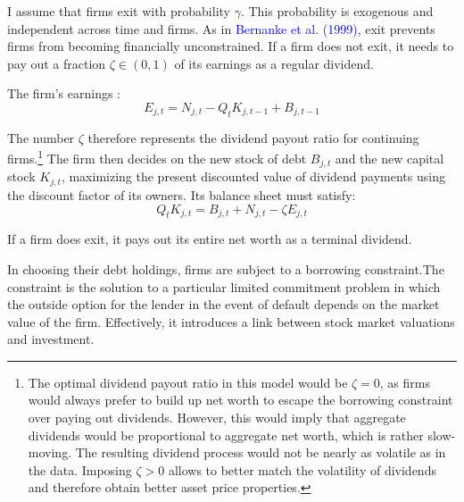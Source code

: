\documentclass[cn,10pt,math=newtx,citestyle=gb7714-2015,bibstyle=gb7714-2015]{elegantbook}
\begin{document}
{{			I assume that firms exit with probability $\gamma$. This probability is exogenous and independent across time and firms. As in \textcolor{blue}{Bernanke et al. (1999)}, exit prevents firms from becoming financially unconstrained. If a firm does not exit, it needs to pay out a fraction $\zeta \in (0, 1)$ of its earnings as a regular dividend.
			
			The firm's earnings :
			$$E_{j,t} = N_{j,t}-Q_tK_{j,t-1}+B_{j,t-1}$$
			
			The number $\zeta$ therefore represents the dividend payout ratio for continuing firms.\footnote{The optimal dividend payout ratio in this model would be $\zeta = 0$, as firms would always prefer to build up net worth to escape the borrowing constraint over paying out dividends. However, this would imply that aggregate dividends would be proportional to aggregate net worth, which is rather slow-moving. The resulting dividend process would not be nearly as volatile as in the data. Imposing $\zeta > 0$ allows to better match the volatility of dividends and therefore obtain better asset price properties.} The firm then decides on the new stock of debt $B_{j,t}$ and the new capital stock $K_{j,t}$, maximizing the present discounted value of dividend
			payments using the discount factor of its owners. Its balance sheet must satisfy:
			\begin{equation}
				Q_tK_{j,t} = B_{j,t} + N_{j,t} -\zeta E_{j,t}
			\end{equation}
			
			If a firm does exit, it pays out its entire net worth as a terminal dividend.
			
			In choosing their debt holdings, firms are subject to a borrowing constraint.The constraint is the solution to a particular limited commitment problem in which the outside option for the lender in the event of default depends on the market value of the firm. Effectively, it introduces a link between stock market valuations and investment.
			
}}
\end{document}
